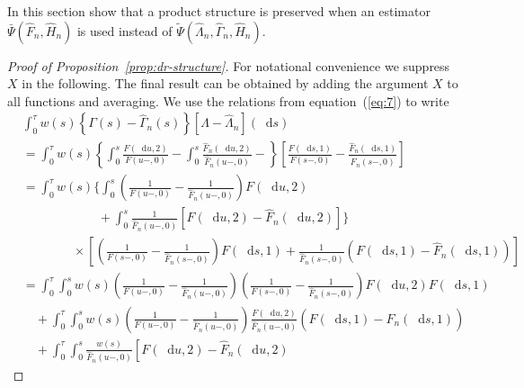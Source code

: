 \documentclass{statsoc}
\newcommand*\diff{\mathop{}\!\mathrm{d}}
\newcommand{\1}{\mathds{1}}
\begin{document}
In this section show that a product structure is preserved when an estimator
$\bar\Psi(\hat{F}_n, \hat{H}_n)$ is used instead of
$\tilde\Psi(\hat{\Lambda}_n, \hat{\Gamma}_n, \hat{H}_n)$.


\begin{proof}[Proof of Proposition~\ref{prop:dr-structure}]
  For notational convenience we suppress \( X \) in the following. The final
  result can be obtained by adding the argument \( X \) to all functions and
  averaging. We use the relations from equation~(\ref{eq:7}) to write
  \begin{align*}
    & \int_0^{\tau} w(s) 
      \left\{
      \Gamma(s) - \hat{\Gamma}_n(s)
      \right\}
      [\Lambda - \hat{\Lambda}_n](\diff s)
    \\
    & =
      \int_0^{\tau} w(s) 
      \left\{
      \int_0^s \frac{F(\diff u, 2)}{F(u-, 0)} -
      \int_0^s \frac{\hat{F}_n(\diff u, 2)}{\hat{F}_n(u-, 0)}  -
      \right\}
      \left[
      \frac{F(\diff s, 1)}{F(s-, 0)}
      - \frac{\hat{F}_n(\diff s, 1)}{\hat{F}_n(s-, 0)}
      \right]
    \\
    & =
      \int_0^{\tau} w(s) 
      \Bigg\{
      \int_0^s 
      \left(
      \frac{1}{F(u-, 0)} -  \frac{1}{\hat{F}_n(u-, 0)}
      \right) F(\diff u, 2)
    \\
    & \qquad\qquad \qquad
      +
      \int_0^s \frac{1}{\hat{F}_n(u-, 0)} 
      \left[
      F(\diff u, 2) - \hat{F}_n(\diff u, 2)
      \right]
      \Bigg\}
    \\
    & \qquad\qquad \times
      \left[
      \left(
      \frac{1}{F(s-, 0)} -
      \frac{1}{\hat{F}_n(s-, 0)}
      \right)F(\diff s, 1)
       + \frac{1}{\hat{F}_n(s-, 0)}
      \left(
      F(\diff s, 1) -
      \hat{F}_n(\diff s, 1)
      \right)
      \right]
    \\
    &
      = \int_0^{\tau} 
      \int_0^s
      w(s) 
      \left(
      \frac{1}{F(u-, 0)} -  \frac{1}{\hat{F}_n(u-, 0)}
      \right) 
      \left(
      \frac{1}{F(s-, 0)} -
      \frac{1}{\hat{F}_n(s-, 0)}
      \right)F(\diff u, 2)F(\diff s, 1)
    \\
    & \quad +
      \int_0^{\tau}
      \int_0^s
      w(s) 
      \left(
      \frac{1}{F(u-, 0)} -  \frac{1}{\hat{F}_n(u-, 0)}
      \right) \frac{F(\diff u, 2) }{\hat{F}_n(u-,0)}
      \left(
      F(\diff s, 1) -
      \hat{F}_n(\diff s, 1)
      \right)
    \\
    & \quad +
      \int_0^{\tau} 
      \int_0^s      
      \frac{w(s) }{\hat{F}_n(u-, 0)} 
      \left[
      F(\diff u, 2) - \hat{F}_n(\diff u, 2)

\end{align*}
\end{proof}
\end{document}
